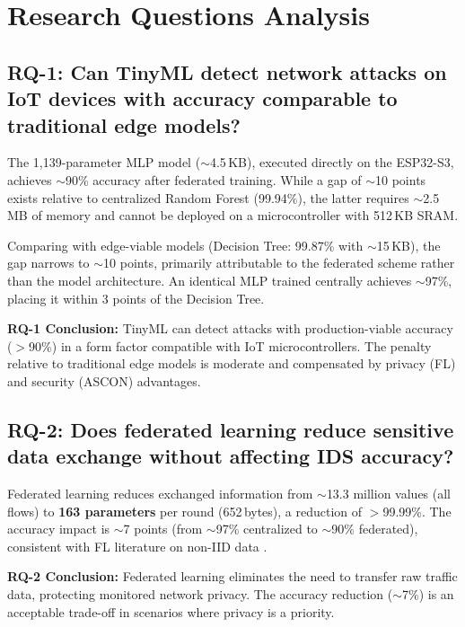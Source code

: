 \section{Research Questions Analysis}
\label{sec:preguntas}

\subsection{RQ-1: Can TinyML detect network attacks on IoT devices with accuracy comparable to traditional edge models?}

The 1,139-parameter MLP model ($\sim$4.5\,KB), executed directly on the ESP32-S3, achieves $\sim$90\% accuracy after federated training. While a gap of $\sim$10 points exists relative to centralized Random Forest (99.94\%), the latter requires $\sim$2.5\,MB of memory and cannot be deployed on a microcontroller with 512\,KB SRAM.

Comparing with edge-viable models (Decision Tree: 99.87\% with $\sim$15\,KB), the gap narrows to $\sim$10 points, primarily attributable to the federated scheme rather than the model architecture. An identical MLP trained centrally achieves $\sim$97\%, placing it within 3 points of the Decision Tree.

\textbf{RQ-1 Conclusion:} TinyML can detect attacks with production-viable accuracy ($>$90\%) in a form factor compatible with IoT microcontrollers. The penalty relative to traditional edge models is moderate and compensated by privacy (FL) and security (ASCON) advantages.

\subsection{RQ-2: Does federated learning reduce sensitive data exchange without affecting IDS accuracy?}

Federated learning reduces exchanged information from $\sim$13.3 million values (all flows) to \textbf{163 parameters} per round (652\,bytes), a reduction of $>$99.99\%. The accuracy impact is $\sim$7 points (from $\sim$97\% centralized to $\sim$90\% federated), consistent with FL literature on non-IID data \cite{Imteaj2022_FL_ResourceConstrainedSurvey, Albanbay2025}.

\textbf{RQ-2 Conclusion:} Federated learning eliminates the need to transfer raw traffic data, protecting monitored network privacy. The accuracy reduction ($\sim$7\%) is an acceptable trade-off in scenarios where privacy is a priority.

